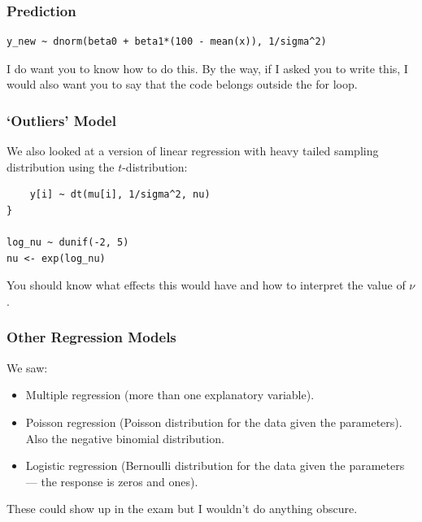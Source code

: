 \documentclass{beamer}
\begin{document}
\begin{frame}[fragile]
\frametitle{Prediction}

\begin{verbatim}
y_new ~ dnorm(beta0 + beta1*(100 - mean(x)), 1/sigma^2)
\end{verbatim}

I do want you to know how to do this. By the way, if I asked you to write this,
I would also want you to say that the code belongs outside the for loop.
\end{frame}


\begin{frame}[fragile]
\frametitle{`Outliers' Model}
We also looked at a version of linear regression with heavy tailed
sampling distribution using the $t$-distribution:

\begin{verbatim}
    y[i] ~ dt(mu[i], 1/sigma^2, nu)
}

log_nu ~ dunif(-2, 5)
nu <- exp(log_nu)
\end{verbatim}

You should know what effects this would have and how to interpret the value
of $\nu$.
\end{frame}

\begin{frame}[fragile]
\frametitle{Other Regression Models}
We saw:

\begin{itemize}
\item Multiple regression (more than one explanatory variable).\pause
\item Poisson regression (Poisson distribution for the data given the
parameters). Also the negative binomial distribution.\pause
\item Logistic regression (Bernoulli distribution for the data given the
parameters --- the response is zeros and ones).\pause
\end{itemize}

These could show up in the exam but I wouldn't do anything obscure.

\end{frame}
\end{document}
